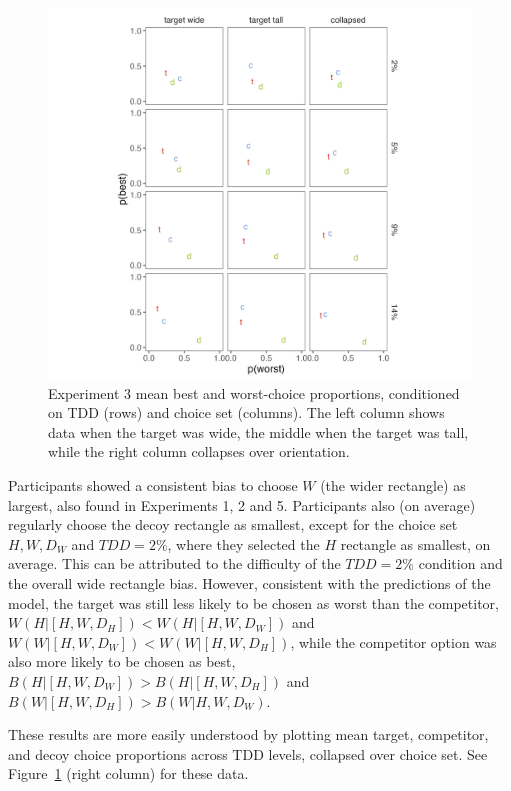 \begin{figure}
   \centering
   \includegraphics[width=170mm]{figures/crit_mean_props.jpeg}
   \caption{Experiment 3 mean best and worst-choice proportions, conditioned on TDD (rows) and choice set (columns). The left column shows data when the target was wide, the middle when the target was tall, while the right column collapses over orientation.}
   \label{fig:bw_mean_choice}
\end{figure}

Participants showed a consistent bias to choose $W$ (the wider rectangle) as largest, also found in Experiments 1, 2 and 5. Participants also (on average) regularly choose the decoy rectangle as smallest, except for the choice set $H,W,D_{W}$ and $TDD=2\%$, where they selected the $H$ rectangle as smallest, on average. This can be attributed to the difficulty of the $TDD=2\%$ condition and the overall wide rectangle bias. However, consistent with the predictions of the model, the target was still less likely to be chosen as worst than the competitor, $W(H|[H,W,D_{H}])<W(H|[H,W,D_{W}])$ and $W(W|[H,W,D_{W}])<W(W|[H,W,D_{H}])$, while the competitor option was also more likely to be chosen as best, $B(H|[H,W,D_{W}])>B(H|[H,W,D_{H}])$ and $B(W|[H,W,D_{H}])>B(W|{H,W,D_{W}})$. 

These results are more easily understood by plotting mean target, competitor, and decoy choice proportions across TDD levels, collapsed over choice set. See Figure~\ref{fig:bw_mean_choice} (right column) for these data. 

